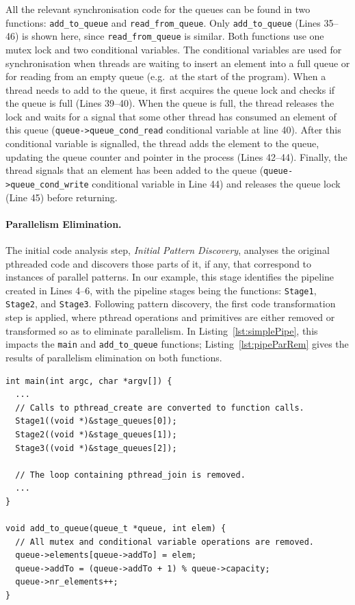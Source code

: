 All the relevant synchronisation code for the queues can be found in two functions: \lstinline{add_to_queue} and \lstinline{read_from_queue}. Only \lstinline{add_to_queue} (Lines 35--46) is shown here, since \lstinline{read_from_queue} is similar. Both functions use one mutex lock and two conditional variables. The conditional variables are used for synchronisation when threads are waiting to insert an element into a full queue or for reading from an empty queue (e.g.\ at the start of the program). When a thread needs to add to the queue, it first acquires the queue lock and checks if the queue is full (Lines 39--40).
When the queue is full, the thread releases the lock and waits for a signal that some other thread has consumed an element of this queue (\lstinline{queue->queue_cond_read} conditional variable at line 40). After this conditional variable is signalled, the thread adds the element to the queue, updating the queue counter and pointer in the process (Lines 42--44). Finally, the thread signals that an element has been added to the queue (\lstinline{queue->queue_cond_write} conditional variable in Line 44) and releases the queue lock (Line 45) before returning.

\paragraph{Parallelism Elimination.}
The initial code analysis step, \emph{Initial Pattern Discovery}, analyses the original pthreaded code and discovers those parts of it, if any, that correspond to instances of parallel patterns. In our example, this stage identifies the pipeline created in Lines 4--6, with the pipeline stages being the functions: \lstinline{Stage1}, \lstinline{Stage2}, and \lstinline{Stage3}. 
Following pattern discovery, the first code transformation step is applied, where pthread operations and primitives are either removed or transformed so as to eliminate parallelism.
In Listing~\ref{lst:simplePipe}, this impacts the \lstinline|main| and \lstinline|add_to_queue| functions; Listing~\ref{lst:pipeParRem} gives the results of parallelism elimination on both functions.

\begin{lstlisting}[caption=Simple Pipeline Code with Parallelism Removed, frame=single, label=lst:pipeParRem]
int main(int argc, char *argv[]) {
  ...
  // Calls to pthread_create are converted to function calls.
  Stage1((void *)&stage_queues[0]);
  Stage2((void *)&stage_queues[1]);
  Stage3((void *)&stage_queues[2]);
  
  // The loop containing pthread_join is removed.
  ...
}

void add_to_queue(queue_t *queue, int elem) {
  // All mutex and conditional variable operations are removed.
  queue->elements[queue->addTo] = elem;
  queue->addTo = (queue->addTo + 1) % queue->capacity;
  queue->nr_elements++;
}
\end{lstlisting}

